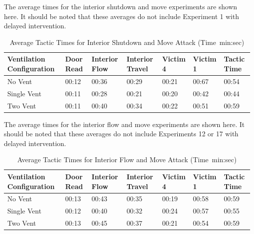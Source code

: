 \documentclass[12pt,oneside]{book}
\begin{document}
\clearpage

The average times for the interior shutdown and move experiments are shown here. It should be noted that these averages do not include Experiment 1 with delayed intervention.

\begin{table} [H]
\centering
\caption{Average Tactic Times for Interior Shutdown and Move Attack (Time~min:sec)}
\begin{tabular}{|C{0.20\textwidth}|C{0.10\textwidth}|C{0.10\textwidth}|C{0.10\textwidth}|C{0.10\textwidth}|C{0.10\textwidth}|C{0.10\textwidth}|}
\hline

Ventilation Configuration & Door Read & Interior Flow & Interior Travel & Victim 4 & Victim 1 & Tactic Time \\ \hline \hline

No Vent 	& 00:12	& 00:36	& 00:29	& 00:21	& 00:67	& 00:54	\\ \hline  
Single Vent & 00:11	& 00:28	& 00:21	& 00:20	& 00:42	& 00:44	\\ \hline
Two Vent 	& 00:11	& 00:40	& 00:34	& 00:22	& 00:51	& 00:59	\\ \hline	
\end{tabular}
\label{tab:shutdown_move_averages}
\end{table}

The average times for the interior flow and move experiments are shown here. It should be noted that these averages do not include Experiments 12 or 17 with delayed intervention.

\begin{table} [H]
\centering
\caption{Average Tactic Times for Interior Flow and Move Attack (Time~min:sec)}
\begin{tabular}{|C{0.20\textwidth}|C{0.10\textwidth}|C{0.10\textwidth}|C{0.10\textwidth}|C{0.10\textwidth}|C{0.10\textwidth}|C{0.10\textwidth}|}
\hline

Ventilation Configuration & Door Read & Interior Flow & Interior Travel & Victim 4 & Victim 1 & Tactic Time \\ \hline \hline

No Vent 	& 00:13	& 00:43	& 00:35	& 00:19	& 00:58	& 00:59	\\ \hline
Single Vent & 00:12	& 00:40	& 00:32	& 00:24	& 00:57	& 00:55	\\ \hline
Two Vent 	& 00:13	& 00:45 & 00:37	& 00:21	& 00:54	& 00:59 \\ \hline
\end{tabular}
\label{tab:flow_move_averages}
\end{table}
\end{document}
